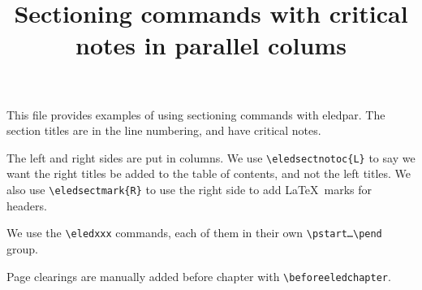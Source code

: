 \documentclass[oneside,12pt]{book}
\begin{document}
\title{Sectioning commands with critical notes in parallel colums}



{\let\newpage\relax\maketitle}
{\small
This file provides examples of using sectioning commands with eledpar. The section titles are in the line numbering, and have critical notes.

The left and right sides are put in columns. We use \verb+\eledsectnotoc{L}+ to say we want the right titles be added to the table of contents, and not the left titles. 
We also use \verb+\eledsectmark{R}+ to use the right side to add \LaTeX\ marks for headers. 

We use the \verb+\eledxxx+ commands, each of them in their own \verb+\pstart…\pend+ group. 

Page clearings are manually added before chapter with \verb+\beforeeledchapter+.
}


\tableofcontents

\beforeeledchapter
\end{document}
